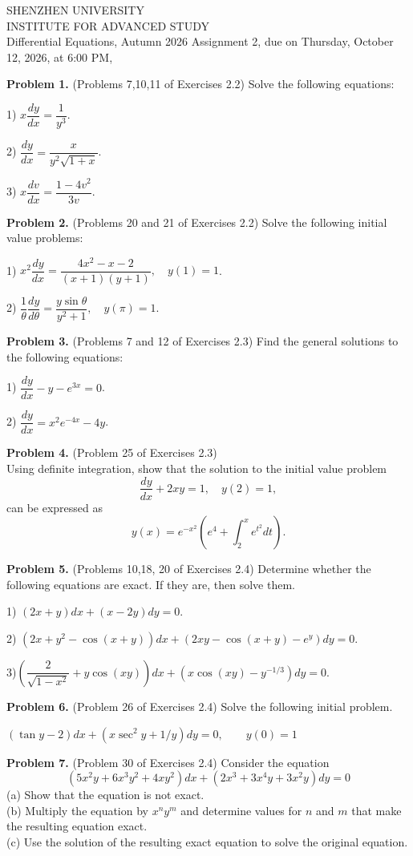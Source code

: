 \documentclass[11pt,a4paper]{article}
\begin{document}
\begin{center}
SHENZHEN UNIVERSITY \\
INSTITUTE FOR ADVANCED STUDY \\
Differential Equations, Autumn 2026
Assignment 2, due on Thursday, October 12, 2026, at 6:00 PM,

\end{center}


\bigskip
\noindent
{\bf Problem 1.}  (Problems 7,10,11 of Exercises 2.2) Solve the following equations:

1) $x\dfrac{dy}{dx}=\dfrac{1}{y^3}$.

2) $\dfrac{dy}{dx}=\dfrac{x}{y^2\sqrt{1+x}}$.


3) $x\dfrac{dv}{dx}=\dfrac{1-4v^2}{3v}$.

\bigskip
\noindent
{\bf Problem 2.}  (Problems 20 and 21 of Exercises 2.2)
Solve the following initial value problems:

1) $x^2\dfrac{dy}{dx}=\dfrac{4x^2- x-2}{(x+1)(y+1)}, \quad y(1)=1$.

2) $\dfrac{1}{\theta}\dfrac{dy}{d\theta}=\dfrac{y \sin \theta}{y^2+1},   \quad y(\pi)=1$.

  

\bigskip
\noindent
{\bf Problem 3.}  (Problems 7 and 12 of Exercises 2.3)
Find the general solutions to the following equations:

1) $\dfrac{dy}{dx}-y-e^{3x}=0$.

2)  $\dfrac{dy}{dx}=x^2e^{-4x}-4y$.




\bigskip
\noindent
{\bf Problem 4.}
(Problem 25 of Exercises 2.3)  \\
\noindent
  Using definite integration, show that the solution to the initial value problem
 $$
 \dfrac{dy}{dx} + 2xy =1,  \quad y(2)=1,
 $$
 can be expressed as
 $$
 y(x) = e^{-x^2} \left( e^4 + \int_2^x e^{t^2} dt \right) .
 $$





\bigskip
\noindent
{\bf Problem 5.}  (Problems 10,18, 20 of Exercises 2.4)
Determine whether the following equations are exact. If they are, then solve them.

1) $(2x+y)dx+(x-2y)dy=0$.

2) $(2x+y^2-\cos (x+y))dx+(2xy-\cos (x+y)-e^y)dy=0$.

3)$\left(\dfrac{2}{\sqrt{1-x^2}}+y\cos (xy)\right)dx+\left(x\cos (xy)-y^{-1/3}\right)dy=0$.



\bigskip
\noindent
{\bf Problem 6.}  (Problem 26 of Exercises 2.4)
Solve the following initial problem.


$(\tan y-2)dx+(x\sec ^2y+1/y)dy=0, \quad \quad y(0)=1$


\bigskip
\noindent
{\bf Problem 7.}
(Problem 30 of Exercises 2.4) Consider the equation
$$
(5x^2y+6x^3y^2+4xy^2)dx+(2x^3+3x^4y+3x^2y)dy=0
$$
(a) Show that the equation is not exact.  \\
\noindent
(b) Multiply the equation by $x^ny^m$ and determine values for $n$ and $m$ that make the resulting equation exact. \\
\noindent
(c) Use the solution of the resulting exact equation to solve the original equation.
\end{document}
